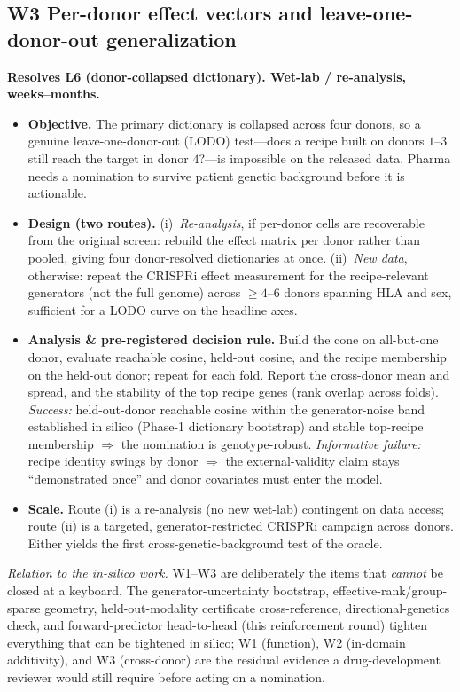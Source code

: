\documentclass[11pt]{article}
\newcommand{\sev}[2]{\textcolor{#1}{\textbf{#2}}}
\begin{document}
\subsection{W3 \quad Per-donor effect vectors and leave-one-donor-out generalization}
\sev{sev2}{Resolves L6 (donor-collapsed dictionary). Wet-lab / re-analysis, weeks--months.}
\begin{itemize}
\item[] \textbf{Objective.} The primary dictionary is collapsed across four donors, so a genuine
leave-one-donor-out (LODO) test---does a recipe built on donors $1$--$3$ still reach the target in
donor $4$?---is impossible on the released data. Pharma needs a nomination to survive patient
genetic background before it is actionable.
\item[] \textbf{Design (two routes).} (i)~\emph{Re-analysis}, if per-donor cells are recoverable
from the original screen: rebuild the effect matrix per donor rather than pooled, giving four
donor-resolved dictionaries at once. (ii)~\emph{New data}, otherwise: repeat the CRISPRi effect
measurement for the recipe-relevant generators (not the full genome) across $\ge\!4$--$6$ donors
spanning HLA and sex, sufficient for a LODO curve on the headline axes.
\item[] \textbf{Analysis \& pre-registered decision rule.} Build the cone on all-but-one donor,
evaluate reachable cosine, held-out cosine, and the recipe membership on the held-out donor; repeat
for each fold. Report the cross-donor mean and spread, and the stability of the top recipe genes
(rank overlap across folds). \emph{Success:} held-out-donor reachable cosine within the
generator-noise band established in silico (Phase-1 dictionary bootstrap) and stable top-recipe
membership $\Rightarrow$ the nomination is genotype-robust. \emph{Informative failure:} recipe
identity swings by donor $\Rightarrow$ the external-validity claim stays ``demonstrated once'' and
donor covariates must enter the model.
\item[] \textbf{Scale.} Route (i) is a re-analysis (no new wet-lab) contingent on data access;
route (ii) is a targeted, generator-restricted CRISPRi campaign across donors. Either yields the
first cross-genetic-background test of the oracle.
\end{itemize}

\noindent\emph{Relation to the in-silico work.} W1--W3 are deliberately the items that
\emph{cannot} be closed at a keyboard. The generator-uncertainty bootstrap, effective-rank/group-%
sparse geometry, held-out-modality certificate cross-reference, directional-genetics check, and
forward-predictor head-to-head (this reinforcement round) tighten everything that can be tightened
in silico; W1 (function), W2 (in-domain additivity), and W3 (cross-donor) are the residual
evidence a drug-development reviewer would still require before acting on a nomination.
\end{document}
